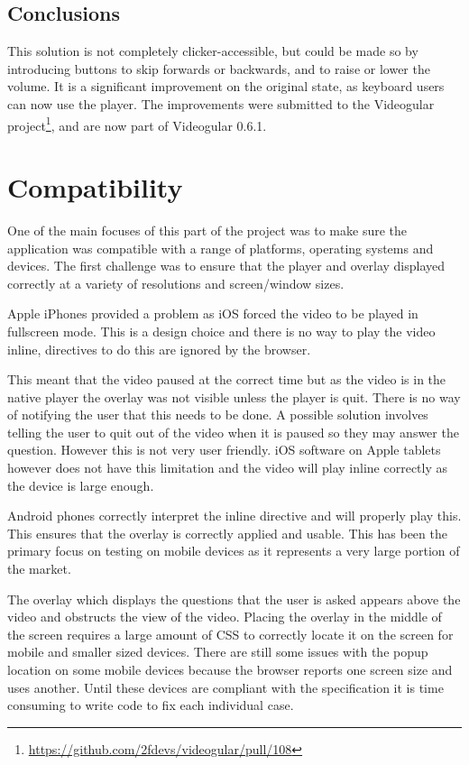 \subsection{Conclusions} 
This solution is not completely clicker-accessible, but could be made so by introducing buttons to skip forwards or backwards, and to raise or lower the volume. It is a significant improvement on the original state, as keyboard users can now use the player. The improvements were submitted to the \gls{Videogular} project\footnote{\url{https://github.com/2fdevs/videogular/pull/108}}, and are now part of \gls{Videogular} 0.6.1.


\section{Compatibility} 
\label{Section:Compatibility}

One of the main focuses of this part of the project was to make sure the application was compatible with a range of platforms, operating systems and devices. The first challenge was to ensure that the player and overlay displayed correctly at a variety of resolutions and screen/window sizes. 

Apple iPhones provided a problem as iOS forced the video to be played in fullscreen mode. This is a design choice and there is no way to play the video inline, directives to do this are ignored by the browser.

This meant that the video paused at the correct time but as the video is in the native player the overlay was not visible unless the player is quit. There is no way of notifying the user that this needs to be done. A possible solution involves telling the user to quit out of the video when it is paused so they may answer the question. However this is not very user friendly. iOS software on Apple tablets however does not have this limitation and the video will play inline correctly as the device is large enough.

Android phones correctly interpret the inline directive and will properly play this. This ensures that the overlay is correctly applied and usable. This has been the primary focus on testing on mobile devices as it represents a very large portion of the market.

The overlay which displays the questions that the user is asked appears above the video and obstructs the view of the video. Placing the overlay in the middle of the screen requires a large amount of \gls{CSS} to correctly locate it on the screen for mobile and smaller sized devices. There are still some issues with the popup location on some mobile devices because the browser reports one screen size and uses another. Until these devices are compliant with the specification it is time consuming to write code to fix each individual case.

